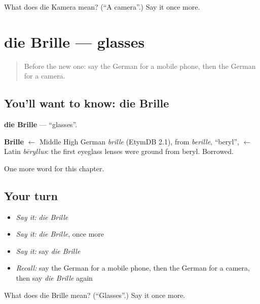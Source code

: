 \begin{tcolorbox}[breakable,colback=teal!4,colframe=teal!35!black,title={Before you move on}]
What does die Kamera mean? (\textquotedblleft{}A camera\textquotedblright{}.) Say it once more.
\end{tcolorbox}
\section[die Brille]{die Brille — glasses}

\label{lesson:GE-C116-brille}



\begin{quote}
Before the new one: say the German for a mobile phone, then the German for a camera.
\end{quote}

\subsection*{You'll want to know: die Brille}
\textbf{die Brille} — \textquotedblleft{}glasses\textquotedblright{}.

\begin{cousinweb}
\textbf{Brille} $\leftarrow$ Middle High German \emph{brille} (EtymDB 2.1), from \emph{berille}, \textquotedblleft{}beryl\textquotedblright{}, $\leftarrow$ Latin \emph{bēryllus}: the first eyeglass lenses were ground from beryl. Borrowed.
\end{cousinweb}

\begin{grammarlens}[title={What you've built}]
One more word for this chapter.
\end{grammarlens}

\subsection*{Your turn}
\begin{itemize}
\raggedright
  \item \emph{Say it:} \emph{die Brille}
  \item \emph{Say it:} \emph{die Brille}, once more
  \item \emph{Say it:} say \emph{die Brille}
  \item \emph{Recall:} say the German for a mobile phone, then the German for a camera, then say \emph{die Brille} again
\end{itemize}

\begin{tcolorbox}[breakable,colback=teal!4,colframe=teal!35!black,title={Before you move on}]
What does die Brille mean? (\textquotedblleft{}Glasses\textquotedblright{}.) Say it once more.
\end{tcolorbox}
